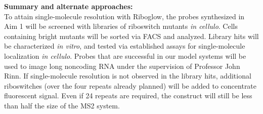 \textbf{Summary and alternate approaches:}\\
To attain single-molecule resolution with Riboglow, the probes synthesized in Aim 1 will be screened with libraries of riboswitch mutants \textit{in cellulo}. Cells containing bright mutants will be sorted via FACS and analyzed. Library hits will be characterized \textit{in vitro}, and tested via established assays for single-molecule localization \textit{in cellulo}. Probes that are successful in our model systems will be used to image long noncoding RNA under the supervision of Professor John Rinn. If single-molecule resolution is not observed in the library hits, additional riboswitches (over the four repeats already planned) will be added to concentrate fluorescent signal. Even if 24 repeats are required, the construct will still be less than half the size of the MS2 system.

